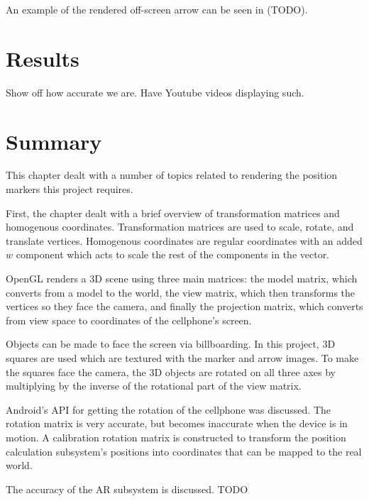 An example of the rendered off-screen arrow can be seen in (TODO).

\section{Results}
Show off how accurate we are. Have Youtube videos displaying such.

\section{Summary}
This chapter dealt with a number of topics related to rendering the position markers this project requires.

First, the chapter dealt with a brief overview of transformation matrices and homogenous coordinates. Transformation matrices are used to scale, rotate, and translate vertices. Homogenous coordinates are regular coordinates with an added $w$ component which acts to scale the rest of the components in the vector.

OpenGL renders a 3D scene using three main matrices: the model matrix, which converts from a model to the world, the view matrix, which then transforms the vertices so they face the camera, and finally the projection matrix, which converts from view space to coordinates of the cellphone's screen.

Objects can be made to face the screen via billboarding. In this project, 3D squares are used which are textured with the marker and arrow images. To make the squares face the camera, the 3D objects are rotated on all three axes by multiplying by the inverse of the rotational part of the view matrix.

Android's API for getting the rotation of the cellphone was discussed. The rotation matrix is very accurate, but becomes inaccurate when the device is in motion. A calibration rotation matrix is constructed to transform the position calculation subsystem's positions into coordinates that can be mapped to the real world.

The accuracy of the AR subsystem is discussed. TODO
